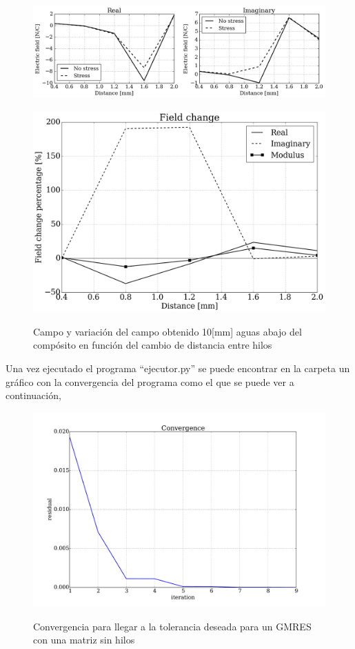 \documentclass[12pt,letterpaper]{article}
\numberwithin{equation}{section}
\begin{document}
\begin{figure}[H]
	\centering\includegraphics[scale=0.6]{Imagenes/field_screen_comparision.png}\\
\end{figure} 
\begin{figure}[H]
	\centering\includegraphics[scale=0.35]{Imagenes/field_change.png}\\
	\caption{Campo y variación del campo obtenido 10[mm] aguas abajo del compósito en función del cambio de distancia entre hilos}
	\label{fig:field_change}
\end{figure}
 
Una vez ejecutado el programa ``ejecutor.py'' se puede encontrar en la carpeta un gráfico con la convergencia del programa como el que se puede ver a continuación,

\begin{figure}[H]
	\centering\includegraphics[scale=0.35]{Imagenes/Convergence.pdf}\\
	\caption{Convergencia para llegar a la tolerancia deseada para un GMRES con una matriz sin hilos}
	\label{fig:convergence}
\end{figure} 
\end{document}
